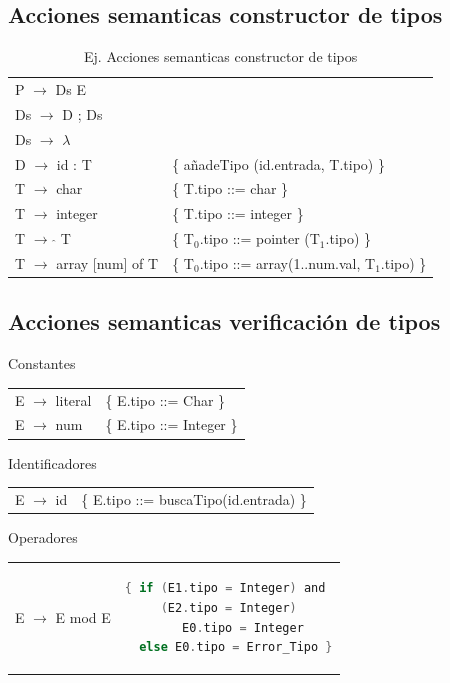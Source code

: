 \documentclass[12pt, twoside, openright]{report} %
\begin{document}
\subsection{Acciones semanticas constructor de tipos}
\begin{table}[H]
	\begin{tabular}{ll}
		P $\rightarrow$ Ds E \\
		Ds $\rightarrow$ D ; Ds \\
		Ds $\rightarrow$ $\lambda$ \\
		D $\rightarrow$ id : T           & \{ añadeTipo (id.entrada, T.tipo) \}               \\
		T $\rightarrow$ char             & \{ T.tipo ::= char \}                              \\
		T $\rightarrow$ integer          & \{ T.tipo ::= integer \}                           \\
		T $\rightarrow$  $\hat{}$ T      & \{ T$_0$.tipo ::= pointer (T$_1$.tipo) \}          \\
		T $\rightarrow$ array [num] of T & \{ T$_0$.tipo ::= array(1..num.val, T$_1$.tipo) \} \\
	\end{tabular}
	\caption{Ej. Acciones semanticas constructor de tipos}
\end{table}

\subsection{Acciones semanticas verificación de tipos}
Constantes
\begin{table}[H]
	\begin{tabular}{ll}
		E $\rightarrow$ literal & \{ E.tipo ::= Char \}    \\
		E $\rightarrow$ num     & \{ E.tipo ::= Integer \} \\
	\end{tabular}
\end{table}

Identificadores
\begin{table}[H]
	\begin{tabular}{ll}
		E $\rightarrow$ id & \{ E.tipo ::= buscaTipo(id.entrada) \} \\
	\end{tabular}
\end{table}

Operadores
\begin{table}[H]
	\begin{tabular}{ll}
		E $\rightarrow$ E mod E &
		\textbf{ } \begin{lstlisting}[language=C]
{ if (E1.tipo = Integer) and
     (E2.tipo = Integer)
        E0.tipo = Integer
  else E0.tipo = Error_Tipo }
\end{lstlisting} \\
	\end{tabular}
\end{table}
\end{document}
